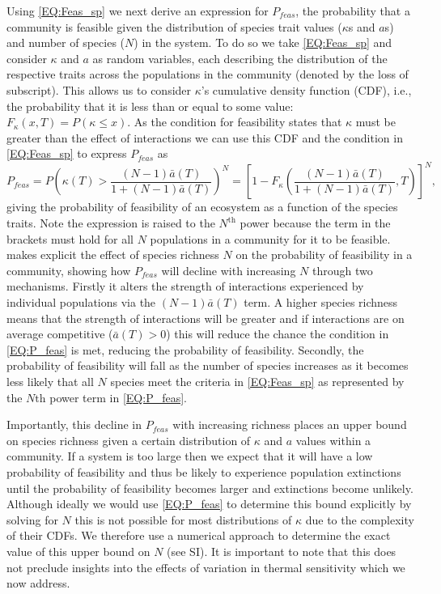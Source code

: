\documentclass{article}
\begin{document}
Using \cref{EQ:Feas_sp} we next derive an expression for $P_{feas}$, the probability that a community is feasible given the distribution of species trait values ($\kappa$s and $a$s) and number of species ($N$) in the system. To do so we take \cref{EQ:Feas_sp} and consider $\kappa$ and $a$ as random variables, each describing the distribution of the respective traits across the populations in the community (denoted by the loss of subscript). This allows us to consider $\kappa$'s cumulative density function (CDF), i.e., the probability that it is less than or equal to some value: $F_{\kappa}(x,T) = P(\kappa \leq x)$. As the condition for feasibility states that $\kappa$ must be greater than the effect of interactions we can use this CDF and the condition in \cref{EQ:Feas_sp} to express $P_{feas}$ as
\begin{equation} \label{EQ:P_feas}
    P_{feas} = P \left( \kappa(T) > \frac{(N-1)\bar{a}(T)}{1 + (N-1)\bar{a}(T)}  \right)^N = 
    \left[1 - F_{\kappa}\left(\frac{(N-1)\bar{a}(T)}{1 + (N-1)\bar{a}(T)},T \right)\right]^N,
\end{equation}
giving the probability of feasibility of an ecosystem as a function of the species traits. Note the expression is raised to the $N^\text{th}$ power because the term in the brackets must hold for all $N$ populations in a community for it to be feasible.  makes explicit the effect of species richness $N$ on the probability of feasibility in a community, showing how $P_{feas}$ will decline with increasing $N$ through two mechanisms. Firstly it alters the strength of interactions experienced by individual populations via the $(N-1) \bar{a}(T)$ term. A higher species richness means that the strength of interactions will be greater and if interactions are on average competitive ($\bar{a}(T) > 0$) this will reduce the chance the condition in \cref{EQ:P_feas} is met, reducing the probability of feasibility. Secondly, the probability of feasibility will fall as the number of species increases as it becomes less likely that all $N$ species meet the criteria in \cref{EQ:Feas_sp} as represented by the $N\text{th}$ power term in \cref{EQ:P_feas}. 

Importantly, this decline in $P_{feas}$ with increasing richness places an upper bound on species richness given a certain distribution of $\kappa$ and $a$ values within a community. If a system is too large then we expect that it will have a low probability of feasibility and thus be likely to experience population extinctions until the probability of feasibility becomes larger and extinctions become unlikely. Although ideally we would use \cref{EQ:P_feas} to determine this bound explicitly by solving for $N$ this is not possible for most distributions of $\kappa$ due to the complexity of their CDFs. We therefore use a numerical approach to determine the exact value of this upper bound on $N$ (see SI). It is important to note that this does not preclude insights into the effects of variation in thermal sensitivity which we now address. 
\end{document}
